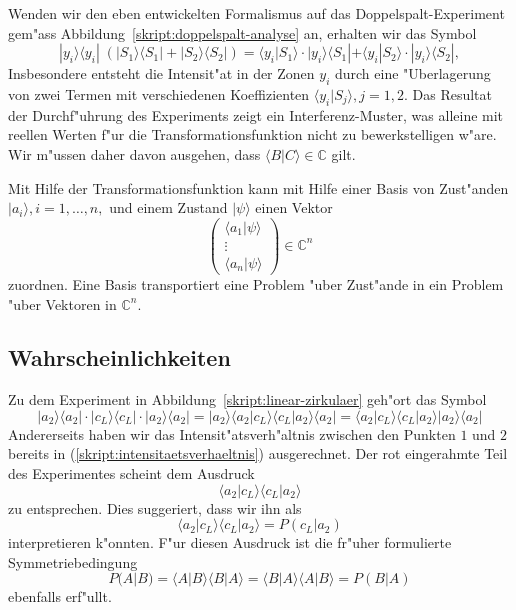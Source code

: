 Wenden wir den eben entwickelten Formalismus auf das Doppelspalt-Experiment
gem"ass Abbildung~\ref{skript:doppelspalt-analyse} an, erhalten wir das Symbol
\[
|y_i\rangle \langle y_i|\; (|S_1\rangle\langle S_1| + |S_2\rangle \langle S_2|)
=
\langle y_i|S_1\rangle
\cdot
|y_i\rangle \langle S_1|
+
\langle y_i|S_2\rangle
\cdot
|y_i\rangle \langle S_2|,
\]
Insbesondere entsteht die Intensit"at in der Zonen $y_i$ durch eine
"Uberlagerung von zwei Termen mit verschiedenen
Koeffizienten $\langle y_i|S_j\rangle, j=1,2$.
Das Resultat der Durchf"uhrung des Experiments zeigt ein Interferenz-Muster,
was alleine mit reellen Werten f"ur die Transformationsfunktion nicht
zu bewerkstelligen w"are.
Wir m"ussen daher davon ausgehen, dass $\langle B|C\rangle\in\mathbb C$ gilt.

Mit Hilfe der Transformationsfunktion kann mit Hilfe einer Basis von Zust"anden
$|a_i\rangle, i=1,\dots, n,$ und einem Zustand $|\psi\rangle$ einen Vektor
\[
\begin{pmatrix}
\langle a_1|\psi\rangle\\
\vdots\\
\langle a_n|\psi\rangle
\end{pmatrix}
\in\mathbb C^n
\]
zuordnen.
Eine Basis transportiert eine Problem "uber Zust"ande in ein
Problem "uber Vektoren in $\mathbb C^n$.

\subsection{Wahrscheinlichkeiten}
Zu dem Experiment in Abbildung~\ref{skript:linear-zirkulaer} geh"ort das Symbol
\[
|a_2\rangle\langle a_2|\cdot
|c_L\rangle\langle c_L|\cdot
|a_2\rangle\langle a_2|
=
|a_2\rangle\langle a_2
|c_L\rangle\langle c_L
|a_2\rangle\langle a_2|
=
\langle a_2
|c_L\rangle\langle c_L
|a_2\rangle
|a_2\rangle
\langle a_2|
\]
Andererseits haben wir das Intensit"atsverh"altnis zwischen den Punkten
$1$ und $2$ bereits in (\ref{skript:intensitaetsverhaeltnis}) ausgerechnet.
Der rot eingerahmte Teil des Experimentes scheint dem Ausdruck
\[
\langle a_2
|c_L\rangle\langle c_L
|a_2\rangle
\]
zu entsprechen.
Dies suggeriert, dass wir ihn als
\[
\langle a_2
|c_L\rangle\langle c_L
|a_2\rangle
=
P(c_L|a_2) 
\]
interpretieren k"onnten. F"ur diesen Ausdruck ist die fr"uher formulierte
Symmetriebedingung 
\[
P(A|B)
=
\langle A |B\rangle
\langle B |A\rangle
=
\langle B |A\rangle
\langle A |B\rangle
=
P(B|A)
\]
ebenfalls erf"ullt.

